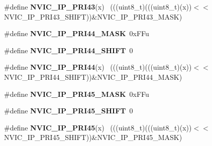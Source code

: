 \begin{DoxyCompactItemize}
\item 
\hypertarget{group___n_v_i_c___register___masks_ga6aebd898717991f35da71e6d202b2e6e}{}\#define {\bfseries N\+V\+I\+C\+\_\+\+I\+P\+\_\+\+P\+R\+I43}(x)                                              ~(((uint8\+\_\+t)(((uint8\+\_\+t)(x))$<$$<$N\+V\+I\+C\+\_\+\+I\+P\+\_\+\+P\+R\+I43\+\_\+\+S\+H\+I\+F\+T))\&N\+V\+I\+C\+\_\+\+I\+P\+\_\+\+P\+R\+I43\+\_\+\+M\+A\+S\+K)\label{group___n_v_i_c___register___masks_ga6aebd898717991f35da71e6d202b2e6e}

\item 
\hypertarget{group___n_v_i_c___register___masks_gab838d0a6505727e91517207dbb6874ea}{}\#define {\bfseries N\+V\+I\+C\+\_\+\+I\+P\+\_\+\+P\+R\+I44\+\_\+\+M\+A\+S\+K}~0x\+F\+Fu\label{group___n_v_i_c___register___masks_gab838d0a6505727e91517207dbb6874ea}

\item 
\hypertarget{group___n_v_i_c___register___masks_ga30b7ecd19dc175be16c68618c24f5820}{}\#define {\bfseries N\+V\+I\+C\+\_\+\+I\+P\+\_\+\+P\+R\+I44\+\_\+\+S\+H\+I\+F\+T}~0\label{group___n_v_i_c___register___masks_ga30b7ecd19dc175be16c68618c24f5820}

\item 
\hypertarget{group___n_v_i_c___register___masks_gaa73334e5d48cac1cd0d2ffaf588cbf66}{}\#define {\bfseries N\+V\+I\+C\+\_\+\+I\+P\+\_\+\+P\+R\+I44}(x)                                              ~(((uint8\+\_\+t)(((uint8\+\_\+t)(x))$<$$<$N\+V\+I\+C\+\_\+\+I\+P\+\_\+\+P\+R\+I44\+\_\+\+S\+H\+I\+F\+T))\&N\+V\+I\+C\+\_\+\+I\+P\+\_\+\+P\+R\+I44\+\_\+\+M\+A\+S\+K)\label{group___n_v_i_c___register___masks_gaa73334e5d48cac1cd0d2ffaf588cbf66}

\item 
\hypertarget{group___n_v_i_c___register___masks_ga58c5f0e1d07366c3bd04ac4c093f21df}{}\#define {\bfseries N\+V\+I\+C\+\_\+\+I\+P\+\_\+\+P\+R\+I45\+\_\+\+M\+A\+S\+K}~0x\+F\+Fu\label{group___n_v_i_c___register___masks_ga58c5f0e1d07366c3bd04ac4c093f21df}

\item 
\hypertarget{group___n_v_i_c___register___masks_ga9612ea4114060dda77f53c8896c4afe8}{}\#define {\bfseries N\+V\+I\+C\+\_\+\+I\+P\+\_\+\+P\+R\+I45\+\_\+\+S\+H\+I\+F\+T}~0\label{group___n_v_i_c___register___masks_ga9612ea4114060dda77f53c8896c4afe8}

\item 
\hypertarget{group___n_v_i_c___register___masks_ga9b33684427d8c651d2992f2c928ba30b}{}\#define {\bfseries N\+V\+I\+C\+\_\+\+I\+P\+\_\+\+P\+R\+I45}(x)                                              ~(((uint8\+\_\+t)(((uint8\+\_\+t)(x))$<$$<$N\+V\+I\+C\+\_\+\+I\+P\+\_\+\+P\+R\+I45\+\_\+\+S\+H\+I\+F\+T))\&N\+V\+I\+C\+\_\+\+I\+P\+\_\+\+P\+R\+I45\+\_\+\+M\+A\+S\+K)\label{group___n_v_i_c___register___masks_ga9b33684427d8c651d2992f2c928ba30b}


\end{DoxyCompactItemize}
